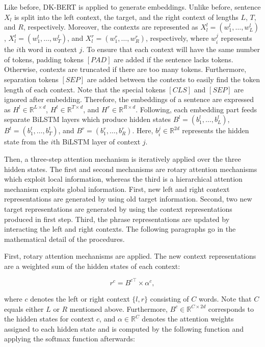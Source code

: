 \documentclass[american, oneside]{ecsgdp}
\begin{document}
Like before, DK-BERT is applied to generate embeddings. Unlike before, sentence $X_l$ is split into the left context, the target, and the right context of lengths $L$, $T$, and $R$, respectively. Moreover, the contexts are represented as $X_l^l = \left ( w_1^l, \ldots, w_L^l \right )$, $X_l^t = \left ( w_1^t, \ldots, w_T^t \right )$, and $X_l^r = \left ( w_1^r, \ldots, w_R^r \right )$, respectively, where $w_i^j$ represents the $i$th word in context $j$. To ensure that each context will have the same number of tokens, padding tokens $[PAD]$ are added if the sentence lacks tokens. Otherwise, contexts are truncated if there are too many tokens. Furthermore, separation tokens $[SEP]$ are added between the contexts to easily find the token length of each context. Note that the special tokens $[CLS]$ and $[SEP]$ are ignored after embedding. Therefore, the embeddings of a sentence are expressed as $H^l \in \mathbb{R}^{L \times d}$, $H^t \in \mathbb{R}^{T \times d}$, and $H^r \in \mathbb{R}^{R \times d}$. Following, each embedding part feeds separate BiLSTM layers which produce hidden states $B^l = \left( b_1^l, \dots, b_L^l \right)$, $B^t = \left( b_1^t, \dots, b_T^t \right)$, and $B^r = \left( b_1^r, \dots, b_R^r \right)$. Here, $b_i^j \in \mathbb{R}^{2d}$ represents the hidden state from the $i$th BiLSTM layer of context $j$.

Then, a three-step attention mechanism is iteratively applied over the three hidden states. The first and second mechanisms are rotary attention mechanisms which exploit local information, whereas the third is a hierarchical attention mechanism exploits global information. First, new left and right context representations are generated by using old target information. Second, two new target representations are generated by using the context representations produced in first step. Third, the phrase representations are updated by interacting the left and right contexts. The following paragraphs go in the mathematical detail of the procedures.

First, rotary attention mechanisms are applied. The new context representations are a weighted sum of the hidden states of each context: 

\begin{equation}
    r^c = B^{c\top} \times \alpha^c, \label{eq:rot_att}
\end{equation}

\noindent where $c$ denotes the left or right context $\{l, r\}$ consisting of $C$ words. Note that $C$ equals either $L$ or $R$ mentioned above. Furthermore, $B^c \in \mathbb{R}^{C \times 2d}$ corresponds to the hidden states for context $c$, and $\alpha \in \mathbb{R}^{C}$ denotes the attention weights assigned to each hidden state and is computed by the following function and applying the softmax function afterwards:
\end{document}
